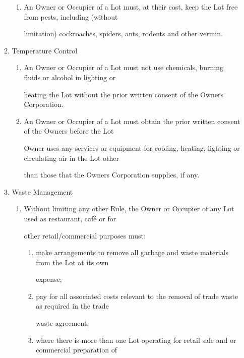 \documentclass{article}
\begin{document}
\begin{enumerate}[label=\arabic*.]
\begin{enumerate}[label=\arabic{enumi}.\arabic*.]
\begin{enumerate}[label=(\arabic*)]
\item  An Owner or Occupier of a Lot must, at their cost, keep the Lot free from pests, including (without 

limitation) cockroaches, spiders, ants, rodents and other vermin. 

\end{enumerate}
\item  Temperature Control 

\begin{enumerate}[label=(\arabic*)]
\item  An Owner or Occupier of a Lot must not use chemicals, burning fluids or alcohol in lighting or 

heating the Lot without the prior written consent of the Owners Corporation. 

\item  An Owner or Occupier of a Lot must obtain the prior written consent of the Owners before the Lot 

Owner uses any services or equipment for cooling, heating, lighting or circulating air in the Lot other 

than those that the Owners Corporation supplies, if any. 

\end{enumerate}
\item  Waste Management 

\begin{enumerate}[label=(\arabic*)]
\item  Without limiting any other Rule, the Owner or Occupier of any Lot used as restaurant, café or for 

other retail/commercial purposes must: 

\begin{enumerate}[label=(\alph*)]
\item  make arrangements to remove all garbage and waste materials from the Lot at its own 

expense; 

\item  pay for all associated costs relevant to the removal of trade waste as required in the trade 

waste agreement; 

\item  where there is more than one Lot operating for retail sale and or commercial preparation of 

\newpage


\end{enumerate}
\end{enumerate}
\end{enumerate}
\end{enumerate}
\end{document}
